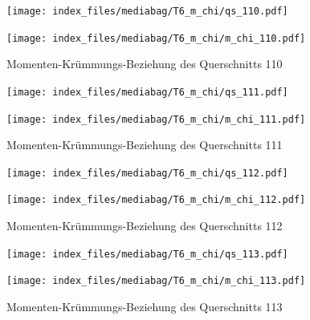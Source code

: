 \documentclass[
  11pt,
  letterpaper,
]{scrreprt}
\begin{document}
\begin{figure}[H]

\begin{minipage}{0.50\linewidth}
\texttt{[image: index\_files/mediabag/T6\_m\_chi/qs\_110.pdf]}\end{minipage}%
%
\begin{minipage}{0.50\linewidth}
\texttt{[image: index\_files/mediabag/T6\_m\_chi/m\_chi\_110.pdf]}\end{minipage}%

\caption{\label{fig-mchi_anhang}Momenten-Krümmungs-Beziehung des
Querschnitts 110}

\end{figure}%

\begin{figure}[H]

\begin{minipage}{0.50\linewidth}
\texttt{[image: index\_files/mediabag/T6\_m\_chi/qs\_111.pdf]}\end{minipage}%
%
\begin{minipage}{0.50\linewidth}
\texttt{[image: index\_files/mediabag/T6\_m\_chi/m\_chi\_111.pdf]}\end{minipage}%

\caption{\label{fig-mchi_anhang}Momenten-Krümmungs-Beziehung des
Querschnitts 111}

\end{figure}%

\begin{figure}[H]

\begin{minipage}{0.50\linewidth}
\texttt{[image: index\_files/mediabag/T6\_m\_chi/qs\_112.pdf]}\end{minipage}%
%
\begin{minipage}{0.50\linewidth}
\texttt{[image: index\_files/mediabag/T6\_m\_chi/m\_chi\_112.pdf]}\end{minipage}%

\caption{\label{fig-mchi_anhang}Momenten-Krümmungs-Beziehung des
Querschnitts 112}

\end{figure}%

\begin{figure}[H]

\begin{minipage}{0.50\linewidth}
\texttt{[image: index\_files/mediabag/T6\_m\_chi/qs\_113.pdf]}\end{minipage}%
%
\begin{minipage}{0.50\linewidth}
\texttt{[image: index\_files/mediabag/T6\_m\_chi/m\_chi\_113.pdf]}\end{minipage}%

\caption{\label{fig-mchi_anhang}Momenten-Krümmungs-Beziehung des
Querschnitts 113}

\end{figure}%
\end{document}
